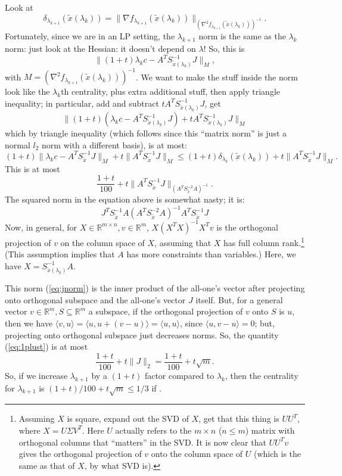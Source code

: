 \documentclass[11pt]{article}
\newcommand{\BR}{\mathbb R}
\begin{document}
Look at
$$
\delta_{\lambda_{k+1}} (\tilde x(\lambda_k)) = \| \nabla f_{\lambda_{k+1}} (\tilde x(\lambda_k)) \|_{(\nabla^2 f_{\lambda_{k+1}}(\tilde x(\lambda_k)))^{-1}}.
$$
Fortunately, since we are in an LP setting, the $\lambda_{k+1}$ norm is the same as the $\lambda_k$ norm: just look at the Hessian: it doesn't depend on $\lambda$! So, this is
$$
\| (1+t) \lambda_k c - A^T S_{\tilde x(\lambda_k)}^{-1} J\|_M,
$$
with $M = (\nabla^2 f_{\lambda_{k+1}}(\tilde x(\lambda_k)))^{-1}$. We want to make the stuff inside the norm look like the $\lambda_k$th centrality, plus extra additional stuff, then apply triangle inequality; in particular, add and subtract $ t A^T S_{\tilde x(\lambda_k)}^{-1} J$, get
$$
\| (1+t)(\lambda_k c - A^T S_{\tilde x(\lambda_k)}^{-1} J) + t A^T S_{\tilde x(\lambda_k)}^{-1} J \|_M
$$
which by triangle inequality (which follows since this ``matrix norm'' is just a normal $l_2$ norm with a different basis), is at most:
$$
(1+t) \| \lambda_k c - A^T S_{\tilde x}^{-1} J \|_M + t \| A^T S_{\tilde x}^{-1} J\|_M \leq (1+t) \delta_{\lambda_k}(\tilde x(\lambda_k)) + t \| A^T S_{\tilde x}^{-1} J\|_M.
$$
This is at most
\begin{equation}
\label{eq:1plust}
\frac{1+t}{100} + t \| A^T S_{\tilde x}^{-1} J\|_{(A^T S_{\tilde x}^{-2} A)^{-1}}.
\end{equation}
The squared norm in the equation above is somewhat nasty; it is:
\begin{equation}
\label{eq:jnorm}
J^T S_{\tilde x}^{-1} A (A^T S_{\tilde x}^{-2} A)^{-1} A^T S_{\tilde x}^{-1} J
\end{equation}
Now, in general, for $X \in \BR^{m \times n}, v \in \BR^m$, $X(X^TX)^{-1} X^Tv$ is the orthogonal projection of $v$ on the column space of $X$, assuming that $X$ has full column rank.\footnote{Assuming $X$ is square, expand out the SVD of $X$, get that this thing is $UU^T$, where $X = U\Sigma V^T$. Here $U$ actually refers to the $m \times n$ ($n \leq m$) matrix with orthogonal columns that ``matters'' in the SVD. It is now clear that $UU^Tv$ gives the orthogonal projection of $v$ onto the column space of $U$ (which is the same as that of $X$, by what SVD is).} (This assumption implies that $A$ has more constraints than variables.) Here, we have $X = S_{\tilde x(\lambda_k)}^{-1} A$. 

This norm (\ref{eq:jnorm}) is the inner product of the all-one's vector after projecting onto orthogonal subspace and the all-one's vector $J$ itself. But, for a general vector $v \in \BR^m, S \subseteq \BR^m$ a subspace, if the orthogonal projection of $v$ onto $S$ is $u$, then we have $\langle v, u \rangle = \langle u, u + (v-u) \rangle = \langle u, u \rangle$, since $\langle u, v-u \rangle = 0$; but, projecting onto orthogonal subspace just decreases norms. So, the quantity (\ref{eq:1plust}) is at most
$$
\frac{1+t}{100} + t \| J\|_2 = \frac{1+t}{100} + t \sqrt m.
$$
So, if we increase $\lambda_{k+1}$ by a $(1+t)$ factor compared to $\lambda_k$, then the centrality for $\lambda_{k+1}$ is $(1+t)/100 + t\sqrt m \leq 1/3$ if .
\end{document}
